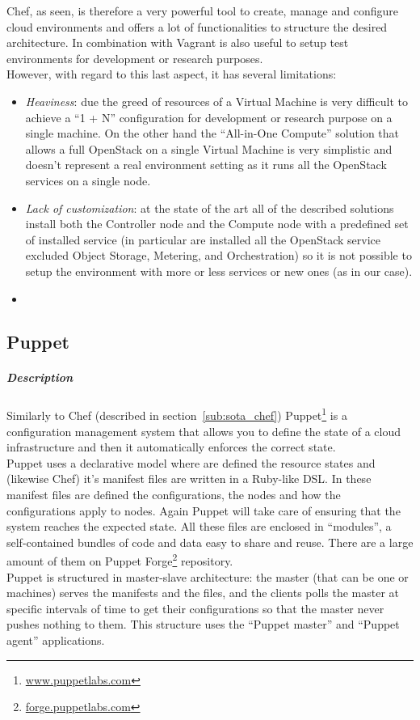 Chef, as seen, is therefore a very powerful tool to create, manage and configure cloud environments and offers a lot of functionalities to structure the desired architecture. In combination with Vagrant is also useful to setup test environments for development or research purposes.\\
However, with regard to this last aspect, it has several limitations:
\begin{itemize}
\item \textit{Heaviness}: due the greed of resources of a Virtual Machine is very difficult to achieve a ``1 + N'' configuration for development or research purpose on a single machine. On the other hand the ``All-in-One Compute'' solution that allows a full OpenStack on a single Virtual Machine is very simplistic and doesn't represent a real environment setting as it runs all the OpenStack services on a single node.
\item \textit{Lack of customization}: at the state of the art all of the described solutions install both the Controller node and the Compute node with a predefined set of installed service (in particular are installed all the OpenStack service excluded Object Storage, Metering, and Orchestration) so it is not possible to setup the environment with more or less services or new ones (as in our case).
\item {}
\end{itemize}

\subsection{Puppet}
\label{sub:sota_puppet}

\subparagraph{Description}
\label{subp:sota_puppet_desc}

Similarly to Chef (described in section~\ref{sub:sota_chef}) Puppet\footnote{\url{www.puppetlabs.com}} is a configuration management system that allows you to define the state of a cloud infrastructure and then it automatically enforces the correct state.\\
Puppet uses a declarative model where are defined the resource states and (likewise Chef) it's manifest files are written in a Ruby-like DSL. In these manifest files are defined the configurations, the nodes and how the configurations apply to nodes. Again Puppet will take care of ensuring that the system reaches the expected state. All these files are enclosed in ``modules'', a self-contained bundles of code and data easy to share and reuse. There are a large amount of them on Puppet Forge\footnote{\url{forge.puppetlabs.com}} repository.\\
Puppet is structured in master-slave architecture: the master (that can be one or machines) serves the manifests and the files, and the clients polls the master at specific intervals of time to get their configurations so that the master never pushes nothing to them. This structure uses the ``Puppet master'' and ``Puppet agent'' applications.


